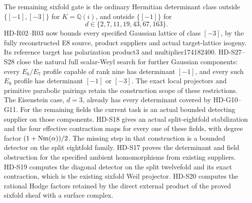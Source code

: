 The remaining sixfold gate is the ordinary Hermitian determinant
class outside $\{[-1],[-3]\}$ for $K=\mathbb Q(i)$, and outside
$\{[-1]\}$ for
\[
 d\in\{2,7,11,19,43,67,163\}.
\]
HD-R02--R03 now bounds every specified Gaussian lattice of class
$[-3]$, by the fully reconstructed E8 source, product suppliers and
actual target-lattice isogeny. Its reference target has polarization
product3 and multiplier174182400. HD-S27--S28 close the natural
full scalar-Weyl search for further Gaussian components: every
$E_6/E_7$ profile capable of rank nine has determinant $[-1]$,
and every such $E_8$ profile has determinant $[-1]$ or $[-3]$.
The exact local projectors and primitive parabolic pairings retain
the construction scope of these restrictions.
The Eisenstein case, $d=3$, already has every determinant covered by
HD-G10--G11. For the remaining fields the current task is an actual
bounded detecting supplier on those components. HD-S18 gives an actual
split-eightfold stabilization and the four effective contraction maps
for every one of these fields, with degree factor
$(1+\operatorname{Nm}(\alpha))/2$. The missing step in that construction is a
bounded detector on the split eightfold family. HD-S17 proves the
determinant and field obstruction for the specified ambient
homomorphisms from existing suppliers. HD-S19 computes the diagonal
detector on the split twelvefold and its exact contraction, which is
the existing sixfold Weil projector. HD-S20 computes the rational
Hodge factors retained by the direct external product of the proved
sixfold sheaf with a surface complex.


